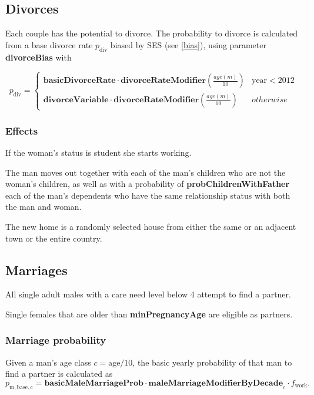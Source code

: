 \documentclass{article}
\newcommand{\marginnote}[1]{\protect\marginpar{\small\texttt{#1}}}
\begin{document}
 
\subsection{Divorces \marginnote{Divorce.jl}} 

Each couple has the potential to divorce. The probability to divorce is calculated from a base divorce rate $p_\textrm{div}$ biased by SES (see \ref{bias}), using parameter \textbf{divorceBias} with 

\[
    p_\textrm{div}  =  \left\{ 
        \begin{array}{ll}
             \mathbf{basicDivorceRate} \cdot \mathbf{divorceRateModifier} ( \frac{age(m)}{10}) & \mathrm{year} < 2012  \\
            \mathbf{divorceVariable} \cdot   \mathbf{divorceRateModifier} ( \frac{age(m)}{10}) & otherwise  
        \end{array}
    \right. 
\]
\subsubsection*{Effects}

If the woman's status is student she starts working.

The man moves out together with each of the man's children who are not the woman's children, as well as with a probability of \textbf{probChildrenWithFather} each of the man's dependents who have the same relationship status with both the man and woman.

The new home is a randomly selected house from either the same or an adjacent town or the entire country. 


\subsection{Marriages \marginnote{Marriage.jl}}

All single adult males with a care need level below 4 attempt to find a partner.

Single females that are older than \textbf{minPregnancyAge} are eligible as partners.

\subsubsection*{Marriage probability}

Given a man's age class $c = \mathrm{age}/10$, the basic yearly probability of that man to find a partner is calculated as 
\[
p_\mathrm{m, base, c} = \mathbf{basicMaleMarriageProb} \cdot \mathbf{maleMarriageModifierByDecade}_c \cdot f_\mathrm{work}.
\]
\end{document}
